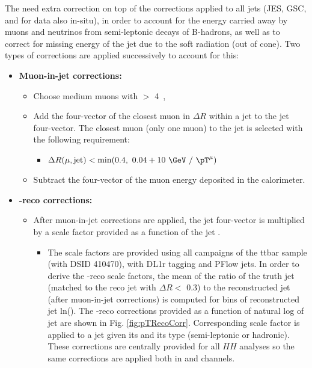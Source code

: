 The \bjets need extra correction on top of the corrections applied to all jets (JES, GSC, and for data also in-situ), 
in order to account for the energy carried away by muons and neutrinos from semi-leptonic decays of B-hadrons, 
as well as to correct for missing energy of the jet due to the soft radiation (out of cone).
Two types of corrections are applied successively to account for this:

\begin{itemize}
   \item \textbf{Muon-in-jet corrections:}
       \begin{itemize}
	  \item Choose medium muons with \pT $>$ 4~\GeV,
	  \item Add the four-vector of the closest muon in $\Delta R$ within a jet to the jet four-vector.
	  The closest muon (only one muon) to the jet is selected with the following requirement: 
	  	\begin{itemize}
		    \item $\Delta R(\mu, \mathrm{jet}) < \mathrm{min}(0.4,~0.04 + 10~\GeV~/~\pT^{\mu})$
		\end{itemize}
	  \item Subtract the four-vector of the muon energy deposited in the calorimeter.
       \end{itemize}
   \item \textbf{\pT-reco corrections:}
       \begin{itemize}
          \item After muon-in-jet corrections are applied, the jet four-vector is multiplied by a scale factor provided as a function of the jet \pT.
          \begin{itemize}
               \item  The scale factors are provided using all campaigns of the ttbar sample (with DSID 410470), with DL1r tagging and PFlow jets.
               	        In order to derive the \pT-reco scale factors, the mean of the ratio of the truth jet \pT (matched to the reco jet with $\Delta R <$ 0.3) 
                         to the reconstructed jet \pT (after muon-in-jet corrections) is computed for bins of reconstructed jet ln(\pT). 
                         The \pT-reco corrections provided as a function of natural log of jet \pT are shown in Fig. \ref{fig:pTRecoCorr}. 
                         Corresponding scale factor is applied to a jet given its \pT and its type (semi-leptonic or hadronic).
                         These corrections are centrally provided for all $HH$ analyses \cite{bJetCorr} so the same corrections are applied both in \lephad and \hadhad channels.
	\end{itemize}	
       \end{itemize}
\end{itemize}

